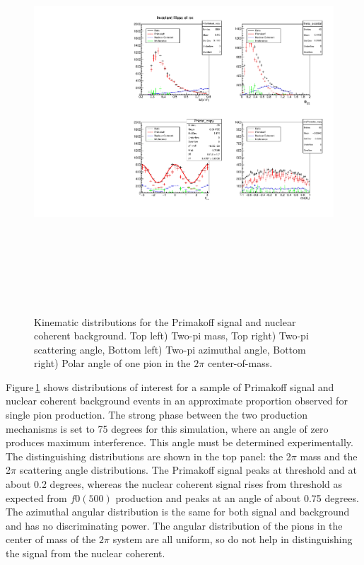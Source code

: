  \begin{figure}[tbp]
\begin{center}
\includegraphics[height=15cm,clip=true]{figures/twopi_primakoff_DSelect_test_File_100000_decomposition_PrimNC.pdf}
\caption{Kinematic distributions for the Primakoff signal and nuclear coherent background.
Top left) Two-pi mass, Top right) Two-pi scattering angle, Bottom left) Two-pi azimuthal angle, 
Bottom right) Polar angle of one pion in the $2\pi$ center-of-mass.
\label{fig:decomposition_PrimNC}}
\end{center} 
\end{figure}


Figure\,\ref{fig:decomposition_PrimNC} shows distributions of interest for a sample of Primakoff signal and
nuclear coherent background events in an approximate proportion observed for single pion production. The strong phase between the two production mechanisms is set to
75 degrees for this simulation, where an angle of zero produces maximum interference. This angle must be determined experimentally. 
The distinguishing distributions are shown in the top panel: the 2$\pi$ mass and the 2$\pi$ scattering angle distributions. The Primakoff signal peaks at threshold and at about 0.2 degrees, whereas the nuclear coherent signal rises from threshold as expected from $f0(500)$ production and peaks at an angle of about 0.75 degrees. The azimuthal angular distribution is the same for both signal and background and has no discriminating power. The angular distribution of the pions in
the center of mass of the $2\pi$ system are all uniform, so do not help in distinguishing the signal from the nuclear coherent.  

